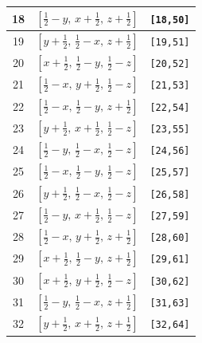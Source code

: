 \documentclass[fleqn,8pt]{jsarticle}
\begin{document}
\begin{longtable}{ccc}
18 & $\left[ \frac{1}{2} - y,\, x + \frac{1}{2},\, z + \frac{1}{2} \right]$ & {\tt [18,50]} \\ \hline
19 & $\left[ y + \frac{1}{2},\, \frac{1}{2} - x,\, z + \frac{1}{2} \right]$ & {\tt [19,51]} \\ \hline
20 & $\left[ x + \frac{1}{2},\, \frac{1}{2} - y,\, \frac{1}{2} - z \right]$ & {\tt [20,52]} \\ \hline
21 & $\left[ \frac{1}{2} - x,\, y + \frac{1}{2},\, \frac{1}{2} - z \right]$ & {\tt [21,53]} \\ \hline
22 & $\left[ \frac{1}{2} - x,\, \frac{1}{2} - y,\, z + \frac{1}{2} \right]$ & {\tt [22,54]} \\ \hline
23 & $\left[ y + \frac{1}{2},\, x + \frac{1}{2},\, \frac{1}{2} - z \right]$ & {\tt [23,55]} \\ \hline
24 & $\left[ \frac{1}{2} - y,\, \frac{1}{2} - x,\, \frac{1}{2} - z \right]$ & {\tt [24,56]} \\ \hline
25 & $\left[ \frac{1}{2} - x,\, \frac{1}{2} - y,\, \frac{1}{2} - z \right]$ & {\tt [25,57]} \\ \hline
26 & $\left[ y + \frac{1}{2},\, \frac{1}{2} - x,\, \frac{1}{2} - z \right]$ & {\tt [26,58]} \\ \hline
27 & $\left[ \frac{1}{2} - y,\, x + \frac{1}{2},\, \frac{1}{2} - z \right]$ & {\tt [27,59]} \\ \hline
28 & $\left[ \frac{1}{2} - x,\, y + \frac{1}{2},\, z + \frac{1}{2} \right]$ & {\tt [28,60]} \\ \hline
29 & $\left[ x + \frac{1}{2},\, \frac{1}{2} - y,\, z + \frac{1}{2} \right]$ & {\tt [29,61]} \\ \hline
30 & $\left[ x + \frac{1}{2},\, y + \frac{1}{2},\, \frac{1}{2} - z \right]$ & {\tt [30,62]} \\ \hline
31 & $\left[ \frac{1}{2} - y,\, \frac{1}{2} - x,\, z + \frac{1}{2} \right]$ & {\tt [31,63]} \\ \hline
32 & $\left[ y + \frac{1}{2},\, x + \frac{1}{2},\, z + \frac{1}{2} \right]$ & {\tt [32,64]} \\
\end{longtable}
\end{document}
